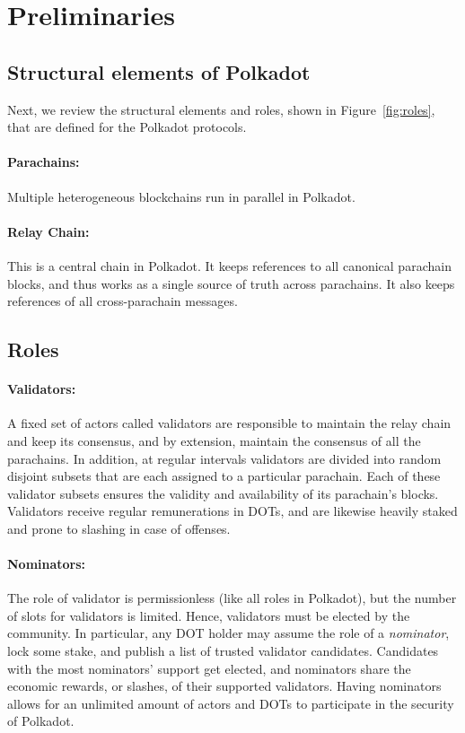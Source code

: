 \section{Preliminaries}\label{sec:preliminiary}

\subsection{Structural elements of Polkadot}
Next, we review the structural elements and roles, shown in Figure~\ref{fig:roles}, that are defined for the Polkadot protocols.
\paragraph{Parachains:} Multiple heterogeneous blockchains run in parallel in Polkadot.

\paragraph{Relay Chain:} This is a central chain in Polkadot. It keeps references
to all canonical parachain blocks, and thus works as a single source of truth across parachains.
It also keeps references of all cross-parachain messages.

\subsection{Roles}

\paragraph{Validators:} A fixed set of actors called validators are responsible to maintain the relay chain
and keep its consensus, and by extension, maintain the consensus of all the parachains.
In addition, at regular intervals validators are divided into random disjoint subsets
that are each assigned to a particular parachain.
Each of these validator subsets ensures the validity and availability of its parachain's blocks.
Validators receive regular remunerations in DOTs,
and are likewise heavily staked and prone to slashing in case of offenses.

\paragraph{Nominators:} The role of validator is permissionless (like all roles in Polkadot),
but the number of slots for validators is limited. Hence, validators must be elected by the community.
In particular, any DOT holder may assume the role of a \emph{nominator}, lock some stake, and publish a list
of trusted validator candidates. Candidates with the most nominators' support get elected,
and nominators share the economic rewards, or slashes, of their supported validators.
Having nominators allows for an unlimited amount of actors and DOTs to participate in the security of Polkadot.

